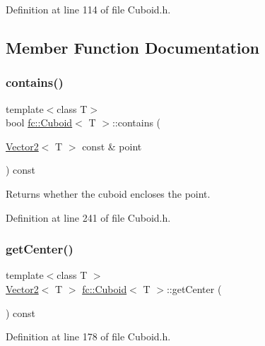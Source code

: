 Definition at line 114 of file Cuboid.\+h.



\subsection{Member Function Documentation}
\mbox{\label{classfc_1_1Cuboid_a5b35e4a5396bab2eeac385435bd301b3}} 
\subsubsection{\texorpdfstring{contains()}{contains()}}
{\footnotesize\ttfamily template$<$class T$>$ \\
bool \hyperlink{classfc_1_1Cuboid}{fc\+::\+Cuboid}$<$ T $>$\+::contains (\begin{DoxyParamCaption}\item[{\hyperlink{classfc_1_1Vector2}{Vector2}$<$ T $>$ const \&}]{point }\end{DoxyParamCaption}) const}



Returns whether the cuboid encloses the point. 



Definition at line 241 of file Cuboid.\+h.

\mbox{\label{classfc_1_1Cuboid_a3e6ec899bce7492a723ec0fac9c16b81}} 
\subsubsection{\texorpdfstring{get\+Center()}{getCenter()}}
{\footnotesize\ttfamily template$<$class T $>$ \\
\hyperlink{classfc_1_1Vector2}{Vector2}$<$ T $>$ \hyperlink{classfc_1_1Cuboid}{fc\+::\+Cuboid}$<$ T $>$\+::get\+Center (\begin{DoxyParamCaption}{ }\end{DoxyParamCaption}) const}



Definition at line 178 of file Cuboid.\+h.

\mbox{\label{classfc_1_1Cuboid_a48625b32d20a38c95dca655b7d7334d8}} 
